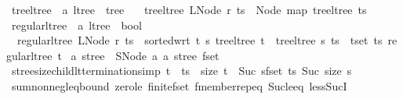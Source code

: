 \begin{isabellebody}
\isanewline
{}\isamarkupfalse%
\ tree{\isacharunderscore}{\kern0pt}ltree\ {\isacharcolon}{\kern0pt}{\isacharcolon}{\kern0pt}\ {\isachardoublequoteopen}{\isacharprime}{\kern0pt}a\ ltree\ {\isasymRightarrow}\ tree{\isachardoublequoteclose}\ \isanewline
\ \ {\isachardoublequoteopen}tree{\isacharunderscore}{\kern0pt}ltree\ {\isacharparenleft}{\kern0pt}LNode\ r\ ts{\isacharparenright}{\kern0pt}\ {\isacharequal}{\kern0pt}\ Node\ {\isacharparenleft}{\kern0pt}map\ tree{\isacharunderscore}{\kern0pt}ltree\ ts{\isacharparenright}{\kern0pt}{\isachardoublequoteclose}\isanewline
\isanewline
{}\isamarkupfalse%
\ regular{\isacharunderscore}{\kern0pt}ltree\ {\isacharcolon}{\kern0pt}{\isacharcolon}{\kern0pt}\ {\isachardoublequoteopen}{\isacharprime}{\kern0pt}a\ ltree\ {\isasymRightarrow}\ bool{\isachardoublequoteclose}\ \isanewline
\ \ {\isachardoublequoteopen}regular{\isacharunderscore}{\kern0pt}ltree\ {\isacharparenleft}{\kern0pt}LNode\ r\ ts{\isacharparenright}{\kern0pt}\ {\isasymlongleftrightarrow}\ sorted{\isacharunderscore}{\kern0pt}wrt\ {\isacharparenleft}{\kern0pt}{\isasymlambda}t\ s{\isachardot}{\kern0pt}\ tree{\isacharunderscore}{\kern0pt}ltree\ t\ {\isasymle}\ tree{\isacharunderscore}{\kern0pt}ltree\ s{\isacharparenright}{\kern0pt}\ ts\ {\isasymand}\ {\isacharparenleft}{\kern0pt}{\isasymforall}t{\isasymin}set\ ts{\isachardot}{\kern0pt}\ regular{\isacharunderscore}{\kern0pt}ltree\ t{\isacharparenright}{\kern0pt}{\isachardoublequoteclose}\isanewline
\isanewline
{}\isamarkupfalse%
\ {\isacharprime}{\kern0pt}a\ stree\ {\isacharequal}{\kern0pt}\ SNode\ {\isacharprime}{\kern0pt}a\ {\isachardoublequoteopen}{\isacharprime}{\kern0pt}a\ stree\ fset{\isachardoublequoteclose}\isanewline
\isanewline
{}\isamarkupfalse%
\ stree{\isacharunderscore}{\kern0pt}size{\isacharunderscore}{\kern0pt}child{\isacharunderscore}{\kern0pt}lt{\isacharbrackleft}{\kern0pt}termination{\isacharunderscore}{\kern0pt}simp{\isacharbrackright}{\kern0pt}{\isacharcolon}{\kern0pt}\ {\isachardoublequoteopen}t\ {\isacharbar}{\kern0pt}{\isasymin}{\isacharbar}{\kern0pt}\ ts\ {\isasymLongrightarrow}\ size\ t\ {\isacharless}{\kern0pt}\ Suc\ {\isacharparenleft}{\kern0pt}{\isasymSum}s{\isasymin}fset\ ts{\isachardot}{\kern0pt}\ Suc\ {\isacharparenleft}{\kern0pt}size\ s{\isacharparenright}{\kern0pt}{\isacharparenright}{\kern0pt}{\isachardoublequoteclose}\isanewline
%
\isadelimproof
\ \ %
\endisadelimproof
%
\isatagproof
{}\isamarkupfalse%
\ sum{\isacharunderscore}{\kern0pt}nonneg{\isacharunderscore}{\kern0pt}leq{\isacharunderscore}{\kern0pt}bound\ zero{\isacharunderscore}{\kern0pt}le\ finite{\isacharunderscore}{\kern0pt}fset\ fmember{\isachardot}{\kern0pt}rep{\isacharunderscore}{\kern0pt}eq\ Suc{\isacharunderscore}{\kern0pt}le{\isacharunderscore}{\kern0pt}eq\ less{\isacharunderscore}{\kern0pt}SucI\ \isamarkupfalse%

\end{isabellebody}
